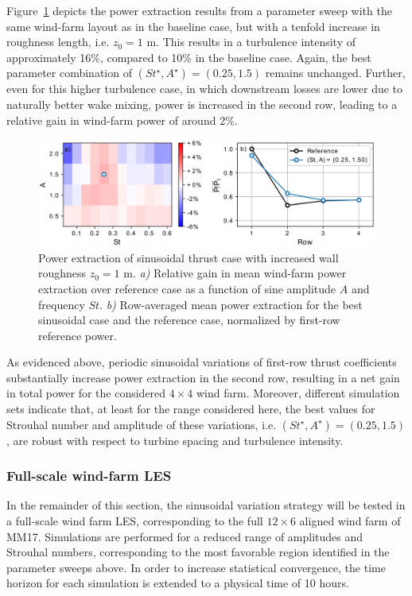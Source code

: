 \documentclass[wes, manuscript]{copernicus}
\newcommand{\revision}[1]{{\color{blue} #1}}
\begin{document}
Figure~\ref{fig:sinus_roughness} depicts the power extraction results from a parameter sweep with the same wind-farm layout as in the baseline case, but with a tenfold increase in roughness length, i.e. $z_0 = 1$ m. This results in a turbulence intensity of approximately 16\%, compared to 10\% in the baseline case. Again, the best parameter combination of $(St^\star, A^\star) = (0.25, 1.5)$ remains unchanged. Further, even for this higher turbulence case, in which downstream losses are lower due to naturally better wake mixing, power is increased in the second row, leading to a relative gain in wind-farm power of around 2\%. 
\begin{figure}
	\centering
	\includegraphics[width=\textwidth]{figure18}
	\caption{Power extraction of sinusoidal thrust case with increased wall roughness $z_0 = 1$ m. \emph{a) } Relative gain in mean wind-farm power extraction over reference case as a function of sine amplitude $A$ and frequency $St$. \emph{b) } Row-averaged mean power extraction for the best sinusoidal case and the reference case, normalized by first-row reference power.\label{fig:sinus_roughness} }
\end{figure}


As evidenced above, periodic sinusoidal variations of first-row thrust coefficients substantially increase power extraction in the second row, resulting in a net gain in total power for the considered $4\times4$ wind farm. Moreover, different simulation sets indicate that, at least for the range considered here, the best values for Strouhal number and amplitude of these variations, i.e. $(St^\star, A^\star) = (0.25, 1.5)$, are robust with respect to turbine spacing and turbulence intensity. 

\subsubsection{\revision{Full-scale wind-farm LES}}
In the remainder of this section, the sinusoidal variation strategy will be tested in a full-scale wind farm \revision{LES}, corresponding to the full $12 \times 6$ aligned wind farm of MM17. Simulations are performed for a reduced range of amplitudes and Strouhal numbers, corresponding to the most favorable region identified in the parameter sweeps above. In order to increase statistical convergence, the time horizon for each simulation is extended to a physical time of 10 hours. 
\end{document}
